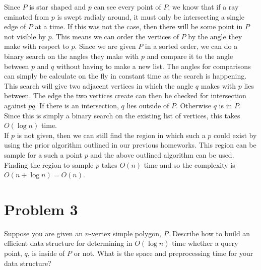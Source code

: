 \documentclass[12pt]{extarticle}
\begin{document}
\begin{solution}
    Since $P$ is star shaped and $p$ can see every point of $P$, we know that if a ray eminated from $p$ is swept radialy around, it must only be intersecting a single edge of $P$ at a time. If this was not the case, then there will be some point in $P$ not visible by $p$. This means we can order the vertices of $P$ by the angle they make with respect to $p$. Since we are given $P$ in a sorted order, we can do a binary search on the angles they make with $p$ and compare it to the angle between $p$ and $q$ without having to make a new list. The angles for comparisons can simply be calculate on the fly in constant time as the search is happening. This search will give two adjacent vertices in which the angle $q$ makes with $p$ lies between. The edge the two vertices create can then be checked for intersection against $\overline{pq}$. If there is an intersection, $q$ lies outside of $P$. Otherwise $q$ is in $P$. Since this is simply a binary search on the existing list of vertices, this takes $O(\log n)$ time.
    \\

    If $p$ is not given, then we can still find the region in which such a $p$ could exist by using the prior algorithm outlined in our previous homeworks. This region can be sample for a such a point $p$ and the above outlined algorithm can be used. Finding the region to sample $p$ takes $O(n)$ time and so the complexity is $O(n + \log n) = O(n)$.
\end{solution}

\section*{Problem 3}
Suppose you are given an $n$-vertex simple polygon, $P$. Describe how to build an efficient data structure for determining in $O(\log n)$ time whether a query point, $q$, is inside of $P$ or not. What is the space and preprocessing time for your data structure?
\end{document}
